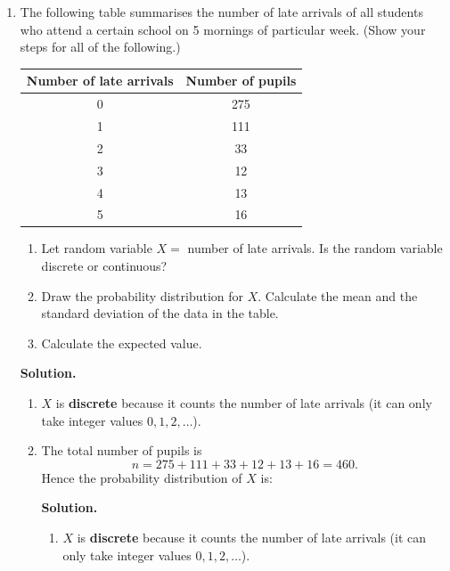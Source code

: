 \documentclass[12pt]{scrartcl}
\begin{document}
\begin{enumerate}[label=\textbf{\arabic*.}]
\newpage
\item The following table summarises the number of late arrivals of all students who attend a certain school on 5 mornings of particular week.
(Show your steps for all of the following.)

\medskip

\begin{center}
\setlength{\tabcolsep}{14pt}
\renewcommand{\arraystretch}{1.2}
\begin{tabular}{c|c}
\textbf{Number of late arrivals} & \textbf{Number of pupils}\\
\hline
0 & 275\\
1 & 111\\
2 & 33\\
3 & 12\\
4 & 13\\
5 & 16\\
\end{tabular}
\end{center}

\medskip

\begin{enumerate}[label=(\alph*)]
\item Let random variable $X=$ number of late arrivals. Is the random variable discrete or continuous?
\item Draw the probability distribution for $X$. Calculate the mean and the standard deviation of the data in the table.
\item Calculate the expected value.
\end{enumerate}

\medskip

\textbf{Solution.}

\begin{enumerate}[label=(\alph*)]
\item $X$ is \textbf{discrete} because it counts the number of late arrivals (it can only take integer values $0,1,2,\dots$).

\item The total number of pupils is
\[
n = 275+111+33+12+13+16 = 460.
\]
Hence the probability distribution of $X$ is:

\textbf{Solution.}

\begin{enumerate}[label=(\alph*)]
\item $X$ is \textbf{discrete} because it counts the number of late arrivals (it can only take integer values $0,1,2,\dots$).


\end{enumerate}
\end{enumerate}
\end{enumerate}
\end{document}

